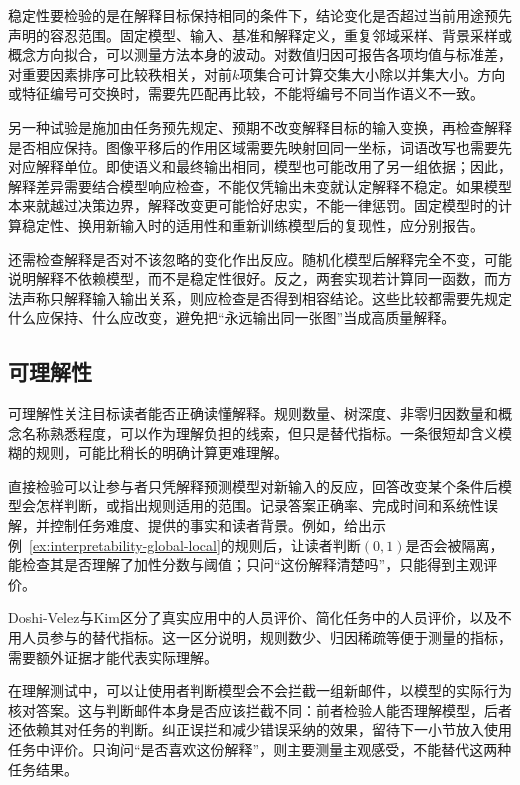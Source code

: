 稳定性要检验的是在解释目标保持相同的条件下，结论变化是否超过当前用途预先声明的容忍范围。固定模型、输入、基准和解释定义，重复邻域采样、背景采样或概念方向拟合，可以测量方法本身的波动。对数值归因可报告各项均值与标准差，对重要因素排序可比较秩相关，对前$k$项集合可计算交集大小除以并集大小。方向或特征编号可交换时，需要先匹配再比较，不能将编号不同当作语义不一致。

另一种试验是施加由任务预先规定、预期不改变解释目标的输入变换，再检查解释是否相应保持。图像平移后的作用区域需要先映射回同一坐标，词语改写也需要先对应解释单位。即使语义和最终输出相同，模型也可能改用了另一组依据；因此，解释差异需要结合模型响应检查，不能仅凭输出未变就认定解释不稳定。如果模型本来就越过决策边界，解释改变更可能恰好忠实，不能一律惩罚。固定模型时的计算稳定性、换用新输入时的适用性和重新训练模型后的复现性，应分别报告。

还需检查解释是否对不该忽略的变化作出反应。随机化模型后解释完全不变，可能说明解释不依赖模型，而不是稳定性很好。反之，两套实现若计算同一函数，而方法声称只解释输入输出关系，则应检查是否得到相容结论。这些比较都需要先规定什么应保持、什么应改变，避免把“永远输出同一张图”当成高质量解释。

\subsection{可理解性}
\label{sec:interpretability-quality-comprehensibility}

可理解性关注目标读者能否正确读懂解释。规则数量、树深度、非零归因数量和概念名称熟悉程度，可以作为理解负担的线索，但只是替代指标。一条很短却含义模糊的规则，可能比稍长的明确计算更难理解。

直接检验可以让参与者只凭解释预测模型对新输入的反应，回答改变某个条件后模型会怎样判断，或指出规则适用的范围。记录答案正确率、完成时间和系统性误解，并控制任务难度、提供的事实和读者背景。例如，给出示例~\ref{ex:interpretability-global-local}的规则后，让读者判断$(0,1)$是否会被隔离，能检查其是否理解了加性分数与阈值；只问“这份解释清楚吗”，只能得到主观评价。

Doshi-Velez与Kim区分了真实应用中的人员评价、简化任务中的人员评价，以及不用人员参与的替代指标。这一区分说明，规则数少、归因稀疏等便于测量的指标，需要额外证据才能代表实际理解。

在理解测试中，可以让使用者判断模型会不会拦截一组新邮件，以模型的实际行为核对答案。这与判断邮件本身是否应该拦截不同：前者检验人能否理解模型，后者还依赖其对任务的判断。纠正误拦和减少错误采纳的效果，留待下一小节放入使用任务中评价。只询问“是否喜欢这份解释”，则主要测量主观感受，不能替代这两种任务结果。

